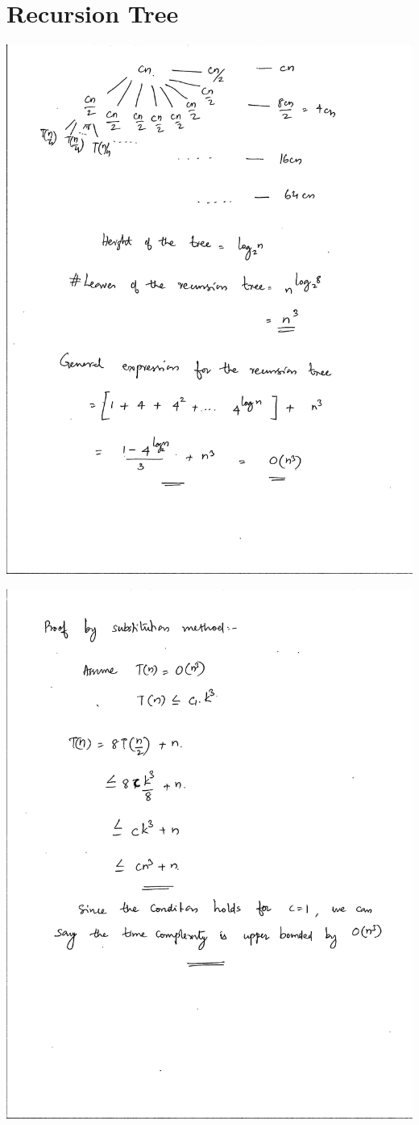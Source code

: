 \documentclass{article}
\begin{document}
\section{Recursion Tree}
\includegraphics[width=20cm]{page1.jpg}
\linebreak
\pagebreak

\includegraphics[width=20cm]{page2.jpg}
\end{document}
